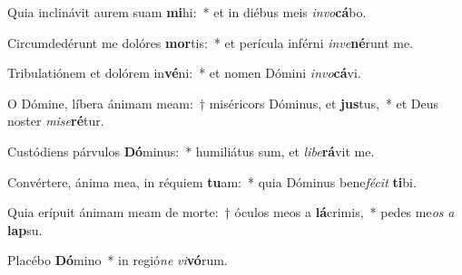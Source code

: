 \item Quia inclinávit aurem suam \textbf{mi}hi:~* et in diébus meis \textit{in}\textit{vo}\textbf{cá}bo.
\item Circumdedérunt me dolóres \textbf{mor}tis:~* et perícula inférni \textit{in}\textit{ve}\textbf{né}runt me.
\item Tribulatiónem et dolórem in\textbf{vé}ni:~* et nomen Dómini \textit{in}\textit{vo}\textbf{cá}vi.
\item O Dómine, líbera ánimam meam:~† miséricors Dóminus, et \textbf{jus}tus,~* et Deus noster \textit{mi}\textit{se}\textbf{ré}tur.
\item Custódiens párvulos \textbf{Dó}minus:~* humiliátus sum, et \textit{li}\textit{be}\textbf{rá}vit me.
\item Convértere, ánima mea, in réquiem \textbf{tu}am:~* quia Dóminus bene\textit{fé}\textit{cit} \textbf{ti}bi.
\item Quia erípuit ánimam meam de morte:~† óculos meos a \textbf{lá}crimis,~* pedes me\textit{os} \textit{a} \textbf{lap}su.
\item Placébo \textbf{Dó}mino~* in regió\textit{ne} \textit{vi}\textbf{vó}rum.
